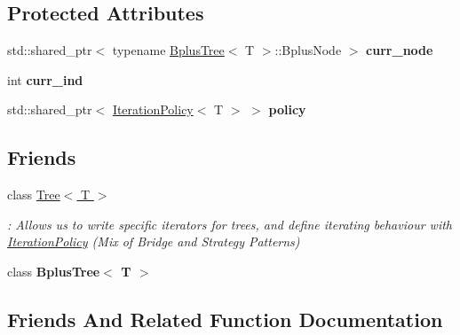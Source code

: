 \subsection*{Protected Attributes}
\begin{DoxyCompactItemize}
\item 
\mbox{\label{classBplusIterator_abe96dd6cf0f07b5e09f7c1f2edcb5133}} 
std\+::shared\+\_\+ptr$<$ typename \hyperlink{classBplusTree}{Bplus\+Tree}$<$ T $>$\+::Bplus\+Node $>$ {\bfseries curr\+\_\+node}
\item 
\mbox{\label{classBplusIterator_a52e2895b9287af97aab551084d4988d2}} 
int {\bfseries curr\+\_\+ind}
\item 
\mbox{\label{classBplusIterator_a909a95b8a8a181c5eb35186bc6537b42}} 
std\+::shared\+\_\+ptr$<$ \hyperlink{classIterationPolicy}{Iteration\+Policy}$<$ T $>$ $>$ {\bfseries policy}
\end{DoxyCompactItemize}
\subsection*{Friends}
\begin{DoxyCompactItemize}
\item 
class \hyperlink{classBplusIterator_a151ca71f2c751d8a163f3f99ccf6cec9}{Tree$<$ T $>$}
\begin{DoxyCompactList}\small\item\em \+: Allows us to write specific iterators for trees, and define iterating behaviour with \hyperlink{classIterationPolicy}{Iteration\+Policy} (Mix of Bridge and Strategy Patterns) \end{DoxyCompactList}\item 
\mbox{\label{classBplusIterator_ae949d4832a26a788061e8632be70661a}} 
class {\bfseries Bplus\+Tree$<$ T $>$}
\end{DoxyCompactItemize}


\subsection{Friends And Related Function Documentation}
\mbox{\label{classBplusIterator_a151ca71f2c751d8a163f3f99ccf6cec9}} 
